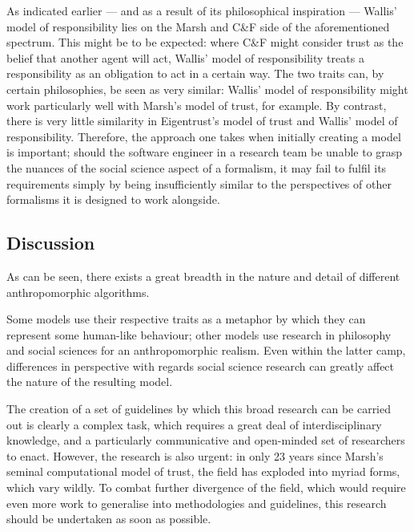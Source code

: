 As indicated earlier --- and as a result of its philosophical inspiration --- Wallis' model of responsibility lies on the Marsh and C\&F side of the aforementioned spectrum. This might be to be expected: where C\&F might consider trust as the belief that another agent will act, Wallis' model of responsibility treats a responsibility as an obligation to act in a certain way. The two traits can, by certain philosophies, be seen as very similar: Wallis' model of responsibility might work particularly well with Marsh's model of trust, for example. By contrast, there is very little similarity in Eigentrust's model of trust and Wallis' model of responsibility. Therefore, the approach one takes when initially creating a model is important; should the software engineer in a research team be unable to grasp the nuances of the social science aspect of a formalism, it may fail to fulfil its requirements simply by being insufficiently similar to the perspectives of other formalisms it is designed to work alongside.\par

\subsection{Discussion}
As can be seen, there exists a great breadth in the nature and detail of different anthropomorphic algorithms.\par

Some models use their respective traits as a metaphor by which they can represent some human-like behaviour; other models use research in philosophy and social sciences for an anthropomorphic realism. Even within the latter camp, differences in perspective with regards social science research can greatly affect the nature of the resulting model.\par

The creation of a set of guidelines by which this broad research can be carried out is clearly a complex task, which requires a great deal of interdisciplinary knowledge, and a particularly communicative and open-minded set of researchers to enact. However, the research is also urgent: in only 23 years since Marsh's seminal computational model of trust, the field has exploded into myriad forms, which vary wildly. To combat further divergence of the field, which would require even more work to generalise into methodologies and guidelines, this research should be undertaken as soon as possible.\par

